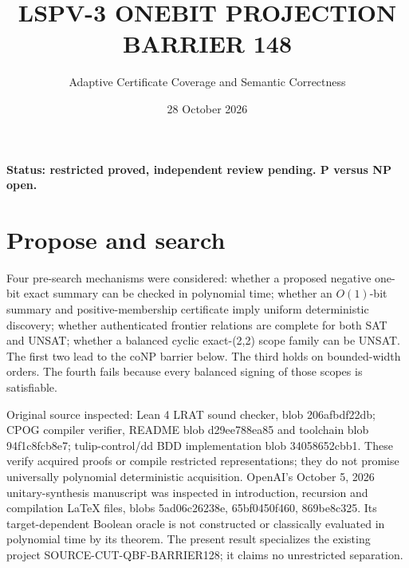 \documentclass[11pt]{article}
\title{LSPV-3 ONEBIT PROJECTION BARRIER 148}
\author{Adaptive Certificate Coverage and Semantic Correctness}
\date{28 October 2026}
\begin{document}
\maketitle
\noindent\textbf{Status: restricted proved, independent review pending. P versus NP open.}
\section{Propose and search}
Four pre-search mechanisms were considered: whether a proposed negative one-bit exact summary can be checked in polynomial time; whether an $O(1)$-bit summary and positive-membership certificate imply uniform deterministic discovery; whether authenticated frontier relations are complete for both SAT and UNSAT; whether a balanced cyclic exact-(2,2) scope family can be UNSAT. The first two lead to the coNP barrier below. The third holds on bounded-width orders. The fourth fails because every balanced signing of those scopes is satisfiable.

Original source inspected: Lean 4 LRAT sound checker, blob 206afbdf22db; CPOG compiler verifier, README blob d29ee788ea85 and toolchain blob 94f1c8fcb8e7; tulip-control/dd BDD implementation blob 34058652cbb1. These verify acquired proofs or compile restricted representations; they do not promise universally polynomial deterministic acquisition. OpenAI's October 5, 2026 unitary-synthesis manuscript was inspected in introduction, recursion and compilation LaTeX files, blobs 5ad06c26238e, 65bf0450f460, 869be8c325. Its target-dependent Boolean oracle is not constructed or classically evaluated in polynomial time by its theorem. The present result specializes the existing project SOURCE-CUT-QBF-BARRIER128; it claims no unrestricted separation.
\end{document}
